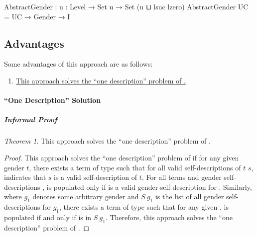 \documentclass{article}
\theoremstyle{remark}
\newtheorem{theorem}{Theorem}
\newcommand{\summaryLink}[2]{\hyperref[#1]{#2}}
\begin{document}
\begin{code}
  AbstractGender : {u : Level} → Set u → Set (u ⊔ lsuc lzero)
  AbstractGender UC = UC → Gender → I
\end{code}

\subsection{Advantages}\label{sec:gender7advantages}
Some advantages of this approach are as follows:

\begin{enumerate}
  \item \summaryLink{sec:gender7solutionOneDescription}{This approach solves the ``one description'' problem of \fref{enum:gender6flawsMultiDesc}.}
\end{enumerate}

\paragraph{``One Description'' Solution}\label{sec:gender7solutionOneDescription}

\subparagraph{Informal Proof}\label{sec:gender7solutionOneProofInformal}

\begin{theorem}
  This approach solves the ``one description'' problem of .
\end{theorem}
\begin{proof}
  This approach solves the ``one description'' problem of  if for any given gender \(t\), there exists a term  of type  such that for all valid self-descriptions of \(t\) \(s\),  indicates that \(s\) is a valid self-description of \(t\).  For all  terms  and gender self-descriptions ,   is populated only if  is a valid gender-self-description for .  Similarly, where \(g_1\) denotes some arbitrary gender and \(S\ g_1\) is the list of all gender self-descriptions for \(g_1\), there exists a term  of type  such that for any given ,   is populated if and only if  is in \(S\ g_1\).  Therefore, this approach solves the ``one description'' problem of .
\end{proof}
\end{document}
